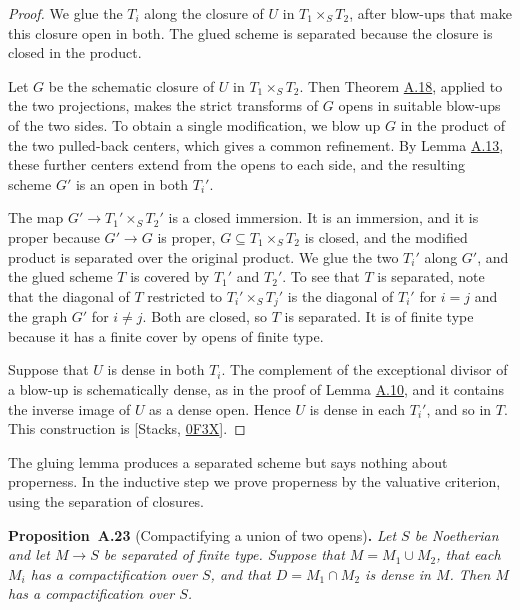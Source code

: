 \documentclass[11pt]{article}
\newenvironment{bpstatement}[2]{\par\addvspace{0.6\baselineskip}\noindent\textbf{#1}#2\textbf{.}\enspace\ignorespaces}
  {\par\addvspace{0.4\baselineskip}}
\newenvironment{bpstatementit}[2]{\begin{bpstatement}{#1}{#2}\itshape\ignorespaces}{\end{bpstatement}}
\begin{document}
\begin{proof}[{Proof}]\label{bp61}%
We glue the \(T_i\) along the closure of \(U\) in \(T_1\times_ST_2\), after blow-ups that make this closure open in both. The glued scheme is separated because the closure is closed in the product.

Let \(G\) be the schematic closure of \(U\) in \(T_1\times_ST_2\). Then Theorem \hyperref[bp48]{A.18}, applied to the two projections, makes the strict transforms of \(G\) opens in suitable blow-ups of the two sides. To obtain a single modification, we blow up \(G\) in the product of the two pulled-back centers, which gives a common refinement. By Lemma \hyperref[bp35]{A.13}, these further centers extend from the opens to each side, and the resulting scheme \(G'\) is an open in both \(T_i'\).

The map \(G'\to T_1'\times_ST_2'\) is a closed immersion. It is an immersion, and it is proper because \(G'\to G\) is proper, \(G\subseteq T_1\times_ST_2\) is closed, and the modified product is separated over the original product. We glue the two \(T_i'\) along \(G'\), and the glued scheme \(T\) is covered by \(T_1'\) and \(T_2'\). To see that \(T\) is separated, note that the diagonal of \(T\) restricted to \(T_i'\times_ST_j'\) is the diagonal of \(T_i'\) for \(i=j\) and the graph \(G'\) for \(i\neq j\). Both are closed, so \(T\) is separated. It is of finite type because it has a finite cover by opens of finite type.

Suppose that \(U\) is dense in both \(T_i\). The complement of the exceptional divisor of a blow-up is schematically dense, as in the proof of Lemma \hyperref[bp29]{A.10}, and it contains the inverse image of \(U\) as a dense open. Hence \(U\) is dense in each \(T_i'\), and so in \(T\). This construction is [Stacks, \href{https://stacks.math.columbia.edu/tag/0F3X}{0F3X}].
\end{proof}

\label{bp62}%
The gluing lemma produces a separated scheme but says nothing about properness. In the inductive step we prove properness by the valuative criterion, using the separation of closures.

\label{bp63}%
\begin{bpstatementit}{Proposition~A.23}{ (Compactifying a union of two opens)}
Let \(S\) be Noetherian and let \(M\to S\) be separated of finite type. Suppose that \(M=M_1\cup M_2\), that each \(M_i\) has a compactification over \(S\), and that \(D=M_1\cap M_2\) is dense in \(M\). Then \(M\) has a compactification over \(S\).
\end{bpstatementit}
\end{document}
